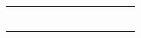 \begin{table}[h]
\begin{tabular}{|c|c|c|c|c|c|c|c|c|c|}
		&                                                       &                                                       &       &                                                           &                                                                                 &                                                       &                                                                                                &       &      \\ \hline
		&                                                       &                                                       &       &                                                           &                                                                                 &                                                       &                                                                                                &       &      \\ \hline
		&                                                       &                                                       &       &                                                           &                                                                                 &                                                       &                                                                                                &       &      \\ \hline
		&                                                       &                                                       &       &                                                           &                                                                                 &                                                       &                                                                                                &       &      \\ \hline
		&                                                       &                                                       &       &                                                           &                                                                                 &                                                       &                                                                                                &       &      \\ \hline
		&                                                       &                                                       &       &                                                           &                                                                                 &                                                       &                                                                                                &       &      \\ \hline

\end{tabular}
\end{table}
